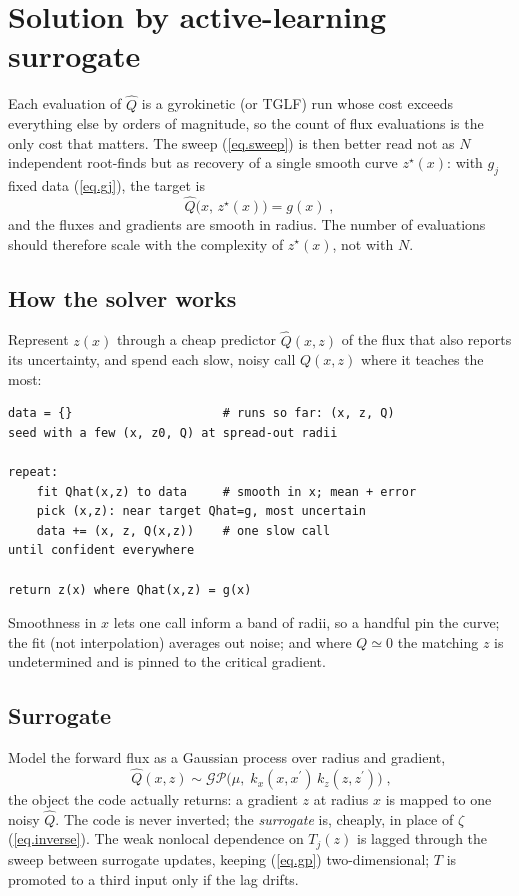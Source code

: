\documentclass[12pt]{article}
\newcommand\qhat{\widehat{Q}}
\begin{document}
\section{Solution by active-learning surrogate}
\label{sec.surrogate}

Each evaluation of $\qhat$ is a gyrokinetic (or TGLF) run whose cost
exceeds everything else by orders of magnitude, so the count of flux
evaluations is the only cost that matters.  The sweep (\ref{eq.sweep})
is then better read not as $N$ independent root-finds but as recovery of
a single smooth curve $z^\star(x)$: with $g_j$ fixed data (\ref{eq.gj}),
the target is
%
\begin{equation}
\qhat\bigl( x,\, z^\star(x) \bigr) = g(x) \; ,
\label{eq.rootcurve}
\end{equation}
%
and the fluxes and gradients are smooth in radius.  The number of
evaluations should therefore scale with the complexity of $z^\star(x)$,
not with $N$.

\subsection{How the solver works}

Represent $z(x)$ through a cheap predictor $\widehat Q(x,z)$ of the flux
that also reports its uncertainty, and spend each slow, noisy call
$Q(x,z)$ where it teaches the most:
%
\begin{verbatim}
data = {}                     # runs so far: (x, z, Q)
seed with a few (x, z0, Q) at spread-out radii

repeat:
    fit Qhat(x,z) to data     # smooth in x; mean + error
    pick (x,z): near target Qhat=g, most uncertain
    data += (x, z, Q(x,z))    # one slow call
until confident everywhere

return z(x) where Qhat(x,z) = g(x)
\end{verbatim}
%
Smoothness in $x$ lets one call inform a band of radii, so a handful pin
the curve; the fit (not interpolation) averages out noise; and where $Q
\simeq 0$ the matching $z$ is undetermined and is pinned to the critical
gradient.

\subsection{Surrogate}

Model the forward flux as a Gaussian process over radius and gradient,
%
\begin{equation}
\boxed{\;
\qhat(x,z) \sim \mathcal{GP}\bigl( \mu,\;
 k_x(x,x^\prime)\, k_z(z,z^\prime) \bigr) \; , }
\label{eq.gp}
\end{equation}
%
the object the code actually returns: a gradient $z$ at radius $x$ is
mapped to one noisy $\qhat$.  The code is never inverted; the
\emph{surrogate} is, cheaply, in place of $\zeta$ (\ref{eq.inverse}).
The weak nonlocal dependence on $T_j(z)$ is lagged through the sweep
between surrogate updates, keeping (\ref{eq.gp}) two-dimensional; $T$ is
promoted to a third input only if the lag drifts.
\end{document}
